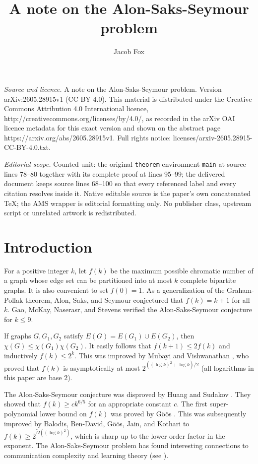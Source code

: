 \documentclass[10pt,a4paper]{amsart}
\begin{document}
\title[A note on the Alon-Saks-Seymour problem]{A note on the Alon-Saks-Seymour problem}
\author{Jacob Fox}
\date{}
\maketitle
\noindent\emph{Source and licence.} A note on the Alon-Saks-Seymour problem. Version arXiv:2605.28915v1 (CC BY 4.0). This material is distributed under the Creative Commons Attribution 4.0 International licence, http://creativecommons.org/licenses/by/4.0/, as recorded in the arXiv OAI licence metadata for this exact version and shown on the abstract page https://arxiv.org/abs/2605.28915v1. Full rights notice: licenses/arxiv-2605.28915-CC-BY-4.0.txt.\par\smallskip
\noindent\textit{Editorial scope.} Counted unit: the original \texttt{theorem} environment \texttt{main} at source lines 78--80 together with its complete proof at lines 95--99; the delivered document keeps source lines 68--100 so that every referenced label and every citation resolves inside it. Native editable source is the paper's own concatenated TeX; the AMS wrapper is editorial formatting only. No publisher class, upstream script or unrelated artwork is redistributed.
\section{Introduction}

For a positive integer $k$, let $f(k)$ be the maximum possible chromatic number of a graph whose edge set can be partitioned into at most $k$ complete bipartite graphs. It is also convenient to set $f(0)=1$. As a generalization of the Graham-Pollak theorem, Alon, Saks, and Seymour conjectured that $f(k)=k+1$ for all $k$. Gao, McKay, Naserasr, and Stevens \cite{GMNS} verified the Alon-Saks-Seymour conjecture for $k \leq 9$. 

If graphs $G,G_1,G_2$ satisfy $E(G) = E(G_1) \cup E(G_2)$, then $\chi(G) \leq \chi(G_1)\chi(G_2)$. It easily follows that $f(k+1) \leq 2f(k)$ and inductively $f(k) \leq 2^k$. This was improved by Mubayi and Vishwanathan \cite{MV}, who proved that $f(k)$ is  asymptotically at most $ 2^{((\log k)^2+\log k)/2}$ (all logarithms in this paper are base $2$).

The Alon-Saks-Seymour conjecture was disproved by Huang and Sudakov \cite{HS}. They showed that $f(k) \geq ck^{6/5}$ for an appropriate constant $c$. The first super-polynomial lower bound on $f(k)$ was proved by G\"o\"os \cite{Goos}. This was subsequently improved by Balodis, Ben-David, G\"o\"os, Jain, and Kothari \cite{BBGJK} to $f(k) \geq 2^{\widetilde{\Omega}((\log k)^2)}$, which is sharp up to the lower order factor in the exponent. The Alon-Saks-Seymour problem has found interesting connections to communication complexity and learning theory (see \cite{BBGJK,HS}). 
\end{document}
